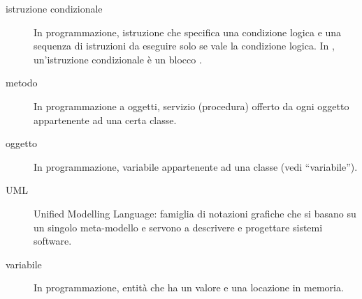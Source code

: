 \begin{description}
	\item[istruzione condizionale] In programmazione, istruzione che specifica una condizione logica e una sequenza di istruzioni da eseguire solo se vale la condizione logica. In \proj, un'istruzione condizionale è un blocco .
	\item[metodo] In programmazione a oggetti, servizio (procedura) offerto da ogni oggetto appartenente ad una certa classe.
	\item[oggetto] In programmazione, variabile appartenente ad una classe (vedi “variabile”).
	\item[UML] Unified Modelling Language: famiglia di notazioni grafiche che si basano su un singolo meta-modello e servono a descrivere e progettare sistemi software.
	\item[variabile] In programmazione, entità che ha un valore e una locazione in memoria.
\end{description}




